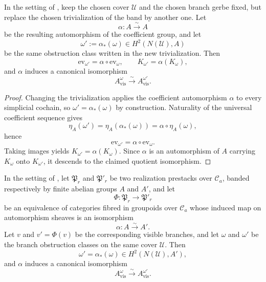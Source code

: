 \begin{proposition}\label{prop:visible-quotient-trivialization-invariance}
In the setting of , keep the chosen cover $\mathcal U$ and the chosen branch gerbe fixed, but replace the chosen trivialization of the band by another one. Let
\[
\alpha:A\xrightarrow{\sim}A
\]
be the resulting automorphism of the coefficient group, and let
\[
\omega':=\alpha_*(\omega)\in H^2(N(\mathcal U),A)
\]
be the same obstruction class written in the new trivialization. Then
\[
\mathrm{ev}_{\omega'}=\alpha\circ \mathrm{ev}_{\omega},
\qquad
K_{\omega'}=\alpha(K_{\omega}),
\]
and $\alpha$ induces a canonical isomorphism
\[
A_{\mathrm{vis}}^{\omega}\xrightarrow{\sim}A_{\mathrm{vis}}^{\omega'}.
\]
\end{proposition}

\begin{proof}
Changing the trivialization applies the coefficient automorphism $\alpha$ to every simplicial cochain, so $\omega'=\alpha_*(\omega)$ by construction. Naturality of the universal coefficient sequence gives
\[
\eta_A(\omega')=\eta_A(\alpha_*(\omega))=\alpha\circ \eta_A(\omega),
\]
hence
\[
\mathrm{ev}_{\omega'}=\alpha\circ \mathrm{ev}_{\omega}.
\]
Taking images yields $K_{\omega'}=\alpha(K_{\omega})$. Since $\alpha$ is an automorphism of $A$ carrying $K_{\omega}$ onto $K_{\omega'}$, it descends to the claimed quotient isomorphism.
\end{proof}

\begin{proposition}\label{prop:visible-quotient-lift-invariance}
In the setting of , let $\mathfrak P_r$ and $\mathfrak P'_r$ be two realization prestacks over $\mathcal C_a$, banded respectively by finite abelian groups $A$ and $A'$, and let
\[
\Phi:\mathfrak P_r\to \mathfrak P'_r
\]
be an equivalence of categories fibred in groupoids over $\mathcal C_a$ whose induced map on automorphism sheaves is an isomorphism
\[
\alpha:A\xrightarrow{\sim}A'.
\]
Let $v$ and $v'=\Phi(v)$ be the corresponding visible branches, and let $\omega$ and $\omega'$ be the branch obstruction classes on the same cover $\mathcal U$. Then
\[
\omega'=\alpha_*(\omega)\in H^2(N(\mathcal U),A'),
\]
and $\alpha$ induces a canonical isomorphism
\[
A_{\mathrm{vis}}^{\omega}\xrightarrow{\sim}A_{\mathrm{vis}}^{\omega'}.
\]
\end{proposition}

